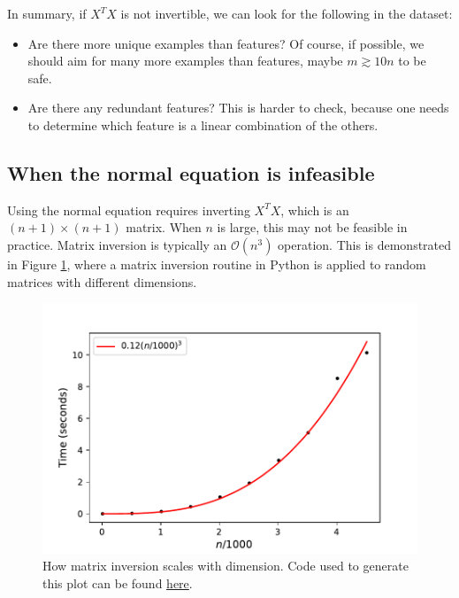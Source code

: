 \documentclass{article}
\theoremstyle{definition}
\begin{document}
In summary, if $X^TX$ is not invertible, we can look for the following in the dataset:
\begin{itemize}
    \item Are there more unique examples than features? Of course, if possible, we should aim for many more examples than features, maybe $m\gtrsim 10n$ to be safe.
    \item Are there any redundant features? This is harder to check, because one needs to determine which feature is a linear combination of the others.
\end{itemize}

\subsection{When the normal equation is infeasible}
\label{section:normal-eq-infeasible}
Using the normal equation requires inverting $X^TX$, which is an $(n+1)\times (n+1)$ matrix. When $n$ is large, this may not be feasible in practice. Matrix inversion is typically an $\mathcal{O}(n^3)$ operation. This is demonstrated in Figure  \ref{linreg-fig:inv-time}, where a matrix inversion routine in Python is applied to random matrices with different dimensions.

\begin{figure}[ht]
\centering
\includegraphics[scale=0.7]{images/lin_reg/inv_time.pdf}
\caption{How matrix inversion scales with dimension. Code used to generate this plot can be found \href{https://github.com/siavashaslanbeigi/ml_notes/blob/master/src/lin_reg/inv_time.ipynb}{\color{blue} here}.}
\label{linreg-fig:inv-time}
\end{figure}
\end{document}
